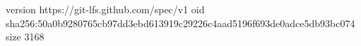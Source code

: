 version https://git-lfs.github.com/spec/v1
oid sha256:50a0b9280765cb97dd3ebd613919c29226c4aad5196f693de0adce5db93bc074
size 3168
